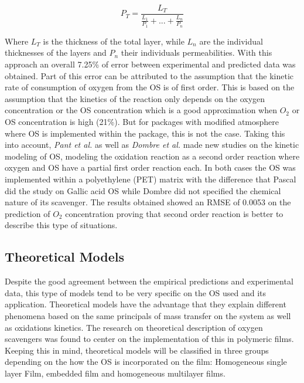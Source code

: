 \begin{refsection}
\begin{equation}
    P_T=\frac{L_T}{\frac{L_1}{P_1}+...+\frac{L_n}{P_n}}
    \label{eq:1}
\end{equation}

Where $L_T$ is the thickness of the total layer, while $L_n$ are the individual thicknesses of the layers and $P_n$  their individuals permeabilities. With this approach an overall 7.25\% of error between experimental and predicted data was obtained. Part of this error can be attributed to  the assumption that the kinetic rate of consumption of oxygen from the OS is of first order. This is based on the assumption that the kinetics of the reaction only depends on the oxygen concentration or the OS concentration which is a good approximation when $O_2$ or OS concentration is high (21\%). But for packages with modified atmosphere where OS is implemented within the package, this is not the case. Taking this into account, \textit{Pant et al.} \cite{Pant2018KineticScavenger} as well as \textit{Dombre et al.} \cite{Dombre2015ProtectionSolution} made  new studies on the kinetic modeling of OS, modeling the oxidation reaction as a second order reaction where oxygen and OS have a partial first order reaction each. In both cases the OS was implemented within a polyethylene (PET) matrix with the difference that Pascal did the study on Gallic acid OS while Dombre did not specified the chemical nature of its scavenger. The results obtained showed an RMSE of 0.0053 on the prediction of $O_2$ concentration proving that second order reaction is better to describe this type of situations. 

\subsection{Theoretical Models}

Despite the good agreement between the empirical predictions and experimental data, this type of models tend to be very specific on the OS used and its application. Theoretical models have the advantage that they explain different phenomena based on the same principals of mass transfer on the system as well as oxidations kinetics. The research on theoretical description of oxygen scavengers was found to center on the implementation of this in polymeric films.  Keeping this in mind, theoretical models will be classified in three groups depending on the how the OS is incorporated on the film: Homogeneous single layer Film, embedded film and homogeneous multilayer films. 


\end{refsection}
